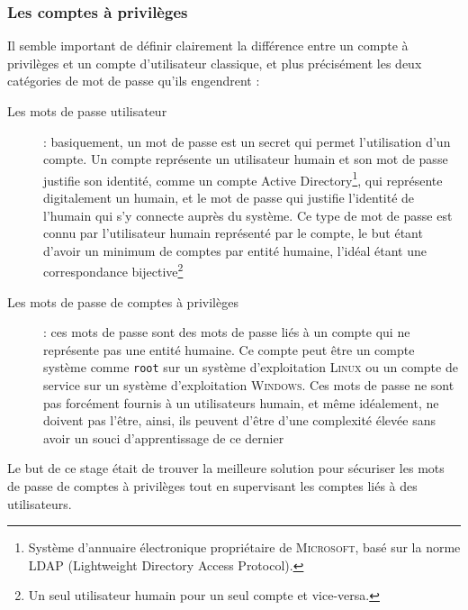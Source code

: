 \subsubsection{Les comptes à privilèges}
Il semble important de définir clairement la différence entre un compte à privilèges et un compte d'utilisateur classique, et plus précisément les deux catégories de mot de passe qu'ils engendrent :
\begin{description}
	\item [Les mots de passe utilisateur] : basiquement, un mot de passe est un secret qui permet l'utilisation d'un compte. Un compte représente un utilisateur humain et son mot de passe justifie son identité, comme un compte Active Directory\footnote{Système d'annuaire électronique propriétaire de \textsc{Microsoft}, basé sur la norme LDAP (Lightweight Directory Access Protocol).}, qui représente digitalement un humain, et le mot de passe qui justifie l'identité de l'humain qui s'y connecte auprès du système. Ce type de mot de passe est connu par l'utilisateur humain représenté par le compte, le but étant d'avoir un minimum de comptes par entité humaine, l'idéal étant une correspondance bijective\footnote{Un seul utilisateur humain pour un seul compte et vice-versa.}
	\item [Les mots de passe de comptes à privilèges] : ces mots de passe sont des mots de passe liés à un compte qui ne représente pas une entité humaine. Ce compte peut être un compte système comme \texttt{root} sur un système d'exploitation \textsc{Linux} ou un compte de service sur un système d'exploitation \textsc{Windows}. Ces mots de passe ne sont pas forcément fournis à un utilisateurs humain, et même idéalement, ne doivent pas l'être, ainsi, ils peuvent d'être d'une complexité élevée sans avoir un souci d'apprentissage de ce dernier
\end{description}

Le but de ce stage était de trouver la meilleure solution pour sécuriser les mots de passe de comptes à privilèges tout en supervisant les comptes liés à des utilisateurs.


